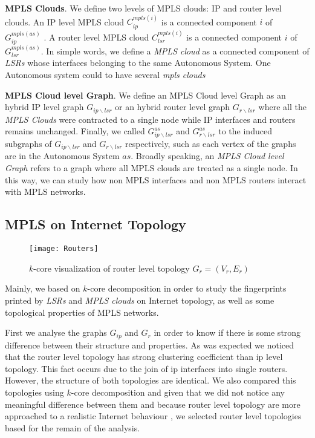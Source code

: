 \textbf{MPLS Clouds}. We define two levels of MPLS clouds: IP and router level clouds. An IP level MPLS cloud $C^{mpls(i)}_{ip}$ is a connected component $i$ of $G^{mpls(as)}_{ip}$ . A router level MPLS cloud $C^{mpls(i)}_{lsr}$ is a connected component $i$ of $G^{mpls(as)}_{lsr}$. In simple words, we define a \textit{MPLS cloud} as a connected component of \textit{LSRs} whose interfaces belonging to the same Autonomous System. One Autonomous system could to have several \textit{mpls clouds}

\textbf{MPLS Cloud level Graph}. We define an MPLS Cloud level Graph as an hybrid IP level graph $G_{ip\backslash lsr}$  or an hybrid router level graph $G_{r\backslash lsr}$  where all the \textit{MPLS Clouds} were contracted to a single node while IP interfaces  and  routers remains unchanged. Finally, we called $G^{as}_{ip\backslash lsr}$ and $G^{as}_{r\backslash lsr}$ to the induced subgraphs of $G_{ip\backslash lsr}$ and $G_{r\backslash lsr}$ respectively, such as each vertex of the graphs are in the Autonomous System $as$. Broadly speaking, an \textit{MPLS Cloud level Graph} refers to a graph where all MPLS clouds are treated as a single node. In this way, we can study how non MPLS interfaces and non MPLS routers interact with MPLS networks.


\subsection{MPLS on Internet Topology} 

\begin{figure}[!t]
\centering
\texttt{[image: Routers]}
\caption{$k$-core visualization of router level topology $G_{r}=(V_{r}, E_{r})$ }
\label{fig_k_core_routers}
\end{figure}

Mainly, we based on $k$-core decomposition in order to study the fingerprints printed by \textit{LSRs} and \textit{MPLS clouds} on Internet topology, as well as some topological properties of MPLS networks. 

First we analyse the graphs $G_{ip}$ and $G_{r}$ in order to know if there is some strong difference between their structure and properties. As was expected we noticed that the router level topology has strong clustering coefficient than ip level topology. This fact occurs due to the join of ip interfaces into single routers. However, the structure of both topologies are identical. We also compared this topologies using $k$-core decomposition and given that we did not notice any meaningful difference between them and because router level topology are more approached to a realistic Internet behaviour , we selected router level topologies based for the remain of the analysis.

